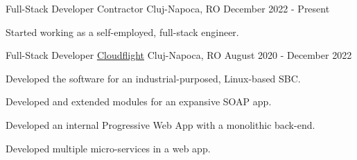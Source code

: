 

\begin{cventries}

  \cventry
  {Full-Stack Developer}
  {Contractor}
  {Cluj-Napoca, RO}
  {December 2022 - Present}
  {
    \begin{cvitems}
      \item {Started working as a self-employed, full-stack engineer.}
    \end{cvitems}
  }

  \cventry
  {Full-Stack Developer}
  {\href{https://cloudflight.io}{Cloudflight}}
  {Cluj-Napoca, RO}
  {August 2020 - December 2022}
  {
    \begin{cvitems}
      \item {Developed the software for an industrial-purposed, Linux-based SBC.}
      \item {Developed and extended modules for an expansive SOAP app.}
      \item {Developed an internal Progressive Web App with a monolithic back-end.}
      \item {Developed multiple micro-services in a web app.}
    \end{cvitems}
  }

\end{cventries}